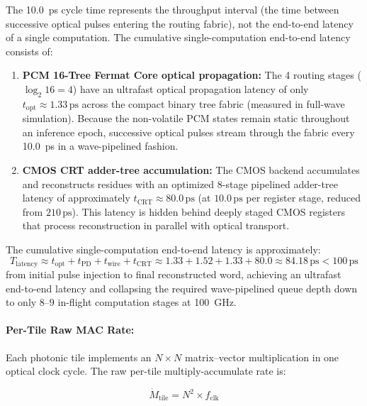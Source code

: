 \documentclass[journal]{IEEEtran}
\begin{document}
The 10.0~ps cycle time represents the throughput interval (the time between successive optical pulses entering the routing fabric), not the end-to-end latency of a single computation. The cumulative single-computation end-to-end latency consists of:

\begin{enumerate}
\item \textbf{PCM 16-Tree Fermat Core optical propagation:} The 4 routing stages ($\log_2 16 = 4$) have an ultrafast optical propagation latency of only $t_{\text{opt}} \approx 1.33\,\text{ps}$ across the compact binary tree fabric (measured in full-wave simulation). Because the non-volatile PCM states remain static throughout an inference epoch, successive optical pulses stream through the fabric every 10.0~ps in a wave-pipelined fashion.

\item \textbf{CMOS CRT adder-tree accumulation:} The CMOS backend accumulates and reconstructs residues with an optimized 8-stage pipelined adder-tree latency of approximately $t_{\text{CRT}} \approx 80.0\,\text{ps}$ (at $10.0\,\text{ps}$ per register stage, reduced from $210\,\text{ps}$). This latency is hidden behind deeply staged CMOS registers that process reconstruction in parallel with optical transport.
\end{enumerate}

The cumulative single-computation end-to-end latency is approximately:
\begin{equation}
T_{\text{latency}} \approx t_{\text{opt}} + t_{\text{PD}} + t_{\text{wire}} + t_{\text{CRT}} \approx 1.33 + 1.52 + 1.33 + 80.0 \approx 84.18\,\text{ps} < 100\,\text{ps}
\end{equation}
from initial pulse injection to final reconstructed word, achieving an ultrafast end-to-end latency and collapsing the required wave-pipelined queue depth down to only $8\text{--}9$ in-flight computation stages at 100~GHz.

\paragraph{\textbf{Per-Tile Raw MAC Rate:}}
Each photonic tile implements an $N \times N$ matrix--vector multiplication in one optical clock cycle. The raw per-tile multiply-accumulate rate is:

\begin{equation}
\dot{M}_{\text{tile}} = N^2 \times f_{\text{clk}}
\end{equation}
\end{document}
